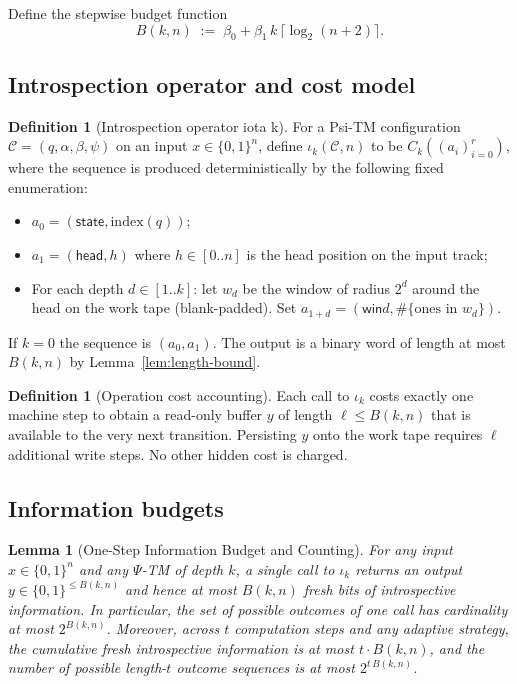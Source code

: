 \documentclass[11pt]{article}
\newtheorem{lemma}[theorem]{Lemma}
\theoremstyle{plain}
\theoremstyle{definition}
\newtheorem{definition}[theorem]{Definition}
\newcommand{\PSi}{\Psi}
\newcommand{\bits}{\{0,1\}}
\begin{document}
Define the stepwise budget function
\begin{equation}
\label{eq:budget}
B(k,n)\;:=\;\beta_0 + \beta_1\,k\,\big\lceil\log_2(n+2)\big\rceil.
\end{equation}

\subsection{Introspection operator and cost model}

\begin{definition}[Introspection operator iota k]
\label{def:iota-k}
For a Psi-TM configuration $\mathcal{C}=(q,\alpha,\beta,\psi)$ on an input $x\in\bits^n$, define $\iota_k(\mathcal{C},n)$ to be $C_k((a_i)_{i=0}^{r})$, where the sequence is produced deterministically by the following fixed enumeration:
\begin{itemize}
  \item $a_0=(\textsf{state},\mathrm{index}(q))$;
  \item $a_1=(\textsf{head},h)$ where $h\in[0..n]$ is the head position on the input track;
  \item For each depth $d\in[1..k]$: let $w_d$ be the window of radius $2^d$ around the head on the work tape (blank-padded). Set $a_{1+d}=(\textsf{win}d,\#\{\text{ones in }w_d\})$.
\end{itemize}
If $k=0$ the sequence is $(a_0,a_1)$. The output is a binary word of length at most $B(k,n)$ by Lemma~\ref{lem:length-bound}.
\end{definition}

\begin{definition}[Operation cost accounting]
\label{def:cost}
Each call to $\iota_k$ costs exactly one machine step to obtain a read-only buffer $y$ of length $\ell\le B(k,n)$ that is available to the very next transition. Persisting $y$ onto the work tape requires $\ell$ additional write steps. No other hidden cost is charged.
\end{definition}

\subsection{Information budgets}

\begin{lemma}[One-Step Information Budget and Counting]
\label{lem:one-step-budget}
For any input $x\in\bits^n$ and any $\PSi$-TM of depth $k$, a single call to $\iota_k$ returns an output $y\in\bits^{\le B(k,n)}$ and hence at most $B(k,n)$ fresh bits of introspective information. In particular, the set of possible outcomes of one call has cardinality at most $2^{B(k,n)}$. Moreover, across $t$ computation steps and any adaptive strategy, the cumulative fresh introspective information is at most $t\cdot B(k,n)$, and the number of possible length-$t$ outcome sequences is at most $2^{t\,B(k,n)}$.
\end{lemma}
\end{document}
